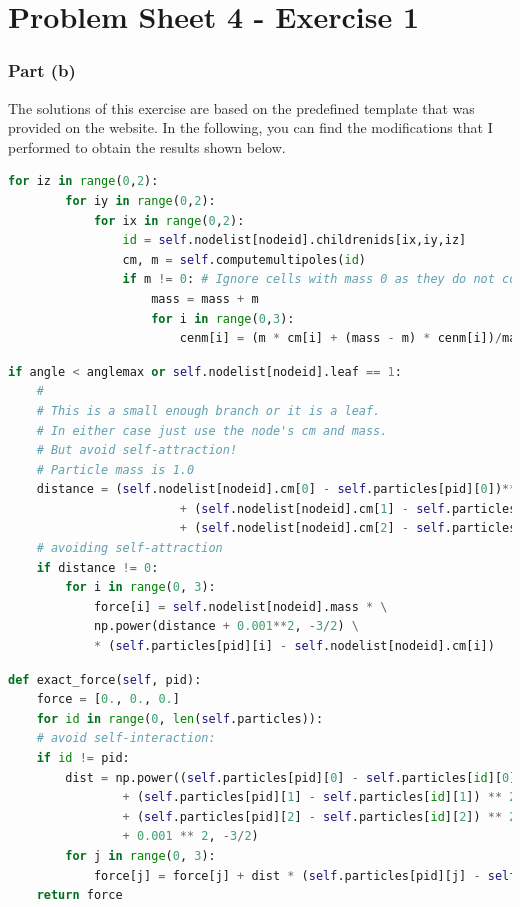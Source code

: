 \documentclass{scrartcl}
\begin{document}
\section*{Problem Sheet 4 - Exercise 1}
\subsubsection*{Part (b)}
The solutions of this exercise are based on the predefined template that was provided on the website. In the following, you can find the modifications that I performed to obtain the results shown below.
\begin{lstlisting}[title=Code for the computation of the center of mass and mass in the tree algorithm., language=Python, frame=single]
	for iz in range(0,2):
		for iy in range(0,2):
			for ix in range(0,2):
				id = self.nodelist[nodeid].childrenids[ix,iy,iz]
				cm, m = self.computemultipoles(id)
				if m != 0: # Ignore cells with mass 0 as they do not contribute
					mass = mass + m
					for i in range(0,3):
						cenm[i] = (m * cm[i] + (mass - m) * cenm[i])/mass
\end{lstlisting}

\begin{lstlisting}[title=Code for the computation of the partial force on the particle.,language=Python, frame=single]
if angle < anglemax or self.nodelist[nodeid].leaf == 1:
	#
	# This is a small enough branch or it is a leaf.
	# In either case just use the node's cm and mass.
	# But avoid self-attraction!
	# Particle mass is 1.0
	distance = (self.nodelist[nodeid].cm[0] - self.particles[pid][0])**2 \
						+ (self.nodelist[nodeid].cm[1] - self.particles[pid][1])**2 \
						+ (self.nodelist[nodeid].cm[2] - self.particles[pid][2])**2
	# avoiding self-attraction
	if distance != 0:
		for i in range(0, 3):
			force[i] = self.nodelist[nodeid].mass * \
			np.power(distance + 0.001**2, -3/2) \
			* (self.particles[pid][i] - self.nodelist[nodeid].cm[i])
\end{lstlisting}

\begin{lstlisting}[title=Code for the computation of the exact forces on a particle.,language=Python, frame=single]
def exact_force(self, pid):
	force = [0., 0., 0.]
	for id in range(0, len(self.particles)):
	# avoid self-interaction:
	if id != pid:
		dist = np.power((self.particles[pid][0] - self.particles[id][0]) ** 2
				+ (self.particles[pid][1] - self.particles[id][1]) ** 2
				+ (self.particles[pid][2] - self.particles[id][2]) ** 2
				+ 0.001 ** 2, -3/2)
		for j in range(0, 3):
			force[j] = force[j] + dist * (self.particles[pid][j] - self.particles[id][j])
	return force
\end{lstlisting}
\end{document}
